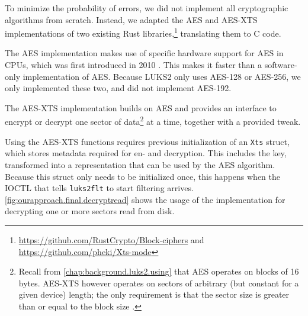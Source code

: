 To minimize the probability of errors, we did not implement all cryptographic algorithms from scratch. Instead, we adapted the AES and AES-XTS implementations of two existing Rust libraries,\footnote{\label{fn:ourapproach.final.rustcrypto} \url{https://github.com/RustCrypto/Block-ciphers} and \url{https://github.com/pheki/Xts-mode}} translating them to C code.

The AES implementation makes use of specific hardware support for AES in CPUs, which was first introduced in 2010 \cite{Intelaes}. This makes it faster than a software-only implementation of AES. Because LUKS2 only uses AES-128 or AES-256, we only implemented these two, and did not implement AES-192.

The AES-XTS implementation builds on AES and provides an interface to encrypt or decrypt one sector of data\footnote{\label{fn:ourapproach.final.blockvssector} Recall from \autoref{chap:background.luks2.using} that AES operates on blocks of 16 bytes. AES-XTS however operates on sectors of arbitrary (but constant for a given device) length; the only requirement is that the sector size is greater than or equal to the block size \cite{Ieee2019}.} at a time, together with a provided tweak.

Using the AES-XTS functions requires previous initialization of an \texttt{Xts} struct, which stores metadata required for en- and decryption. This includes the key, transformed into a representation that can be used by the AES algorithm. Because this struct only needs to be initialized once, this happens when the IOCTL that tells \texttt{luks2flt} to start filtering arrives. \autoref{fig:ourapproach.final.decryptread} shows the usage of the implementation for decrypting one or more sectors read from disk.

